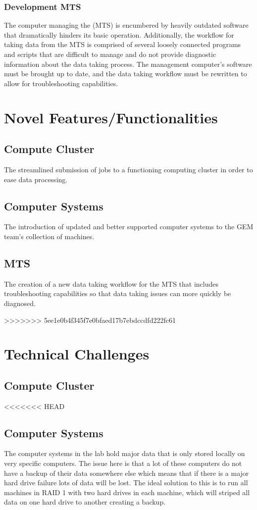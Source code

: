 \documentclass[12pt]{article}
\newcommand\tab[1][1cm]{\hspace*{#1}}
\begin{document}
		\subsubsection{Development MTS}
\tab The computer managing the (MTS) is encumbered by heavily outdated software that dramatically hinders its basic operation. Additionally, the workflow for taking data from the MTS is
comprised of several loosely connected programs and scripts that
are difficult to manage and do not provide diagnostic information
about the data taking process. The management computer’s software must be brought up to date, and the data taking workflow must be rewritten to allow for troubleshooting capabilities.


\section{Novel Features/Functionalities}
\subsection{Compute Cluster}
\tab The streamlined submission of jobs to a functioning computing
cluster in order to ease data processing.
\subsection{Computer Systems}
\tab The introduction of updated and better supported computer systems to the GEM team’s
collection of machines.
\subsection{MTS}
The creation of a new data taking workflow for the MTS that
includes troubleshooting capabilities so that data taking issues can
more quickly be diagnosed.

>>>>>>> 5ee1e0b4f345f7e0bfaed17b7ebdccdfd222fc61


\section{Technical Challenges}
\subsection{Compute Cluster}
<<<<<<< HEAD
\subsection{Computer Systems}
\tab The computer systems in the lab hold major data that is only stored locally on very specific computers. The issue here is that a lot of these computers do not have a backup of their data somewhere else which means that if there is a major hard drive failure lots of data will be lost. The ideal solution to this is to run all machines in RAID 1 with two hard drives in each machine, which will striped all data on one hard drive to another creating a backup. 
\end{document}
